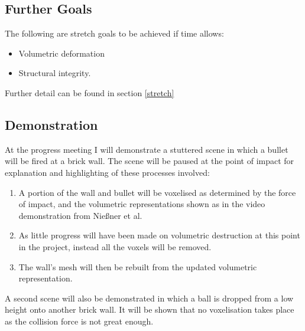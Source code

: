 \subsection{Further Goals}

The following are stretch goals to be achieved if time allows:

\begin{itemize}
\item Volumetric deformation

\item Structural integrity.
\end{itemize}

Further detail can be found in section \ref{stretch}

\clearpage
\subsection{Demonstration}

\label{demo}

At the progress meeting I will demonstrate a stuttered scene in which a bullet will be fired at a brick wall. The scene will be paused at the point of impact for explanation and highlighting of these processes involved:

\begin{enumerate}
\item A portion of the wall and bullet will be voxelised as determined by the force of impact, and the volumetric representations shown as in the video demonstration from Nie{\ss}ner et al\cite{RTCV}.
\item As little progress will have been made on volumetric destruction at this point in the project, instead all the voxels will be removed.
\item The wall's mesh will then be rebuilt from the updated volumetric representation.
\end{enumerate}

A second scene will also be demonstrated in which a ball is dropped from a low height onto another brick wall. It will be shown that no voxelisation takes place as the collision force is not great enough.
